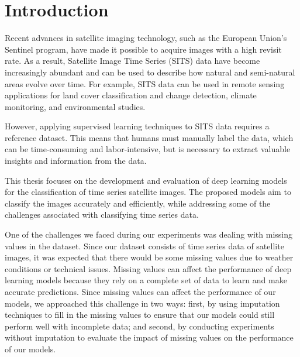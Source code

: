 \chapter{Introduction}


Recent advances in satellite imaging technology, such as the European Union's Sentinel program, have made it possible to acquire images with a high revisit rate.
As a result, Satellite Image Time Series (SITS) data have become increasingly abundant and can be used to describe how natural and semi-natural areas evolve over time.
For example, SITS data can be used in remote sensing applications for land cover classification and change detection, climate monitoring, and environmental studies.

However, applying supervised learning techniques to SITS data requires a reference dataset.
This means that humans must manually label the data, which can be time-consuming and labor-intensive, but is necessary to extract valuable insights and information from the data.


This thesis focuses on the development and evaluation of deep learning models for the classification of time series satellite images.
The proposed models aim to classify the images accurately and efficiently, while addressing some of the challenges associated with classifying time series data.

One of the challenges we faced during our experiments was dealing with missing values in the dataset. 
Since our dataset consists of time series data of satellite images, it was expected that there would be some missing values due to weather conditions or technical issues.
Missing values can affect the performance of deep learning models because they rely on a complete set of data to learn and make accurate predictions.
Since missing values can affect the performance of our models, we approached this challenge in two ways: first, by using imputation techniques to fill in the missing values to ensure that our models could still perform well with incomplete data; and second, by conducting experiments without imputation to evaluate the impact of missing values on the performance of our models.

